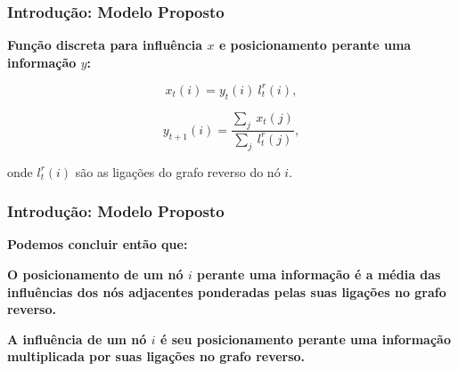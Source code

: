 \begin{frame}
  \frametitle{Introdução: Modelo Proposto}

  \textbf{Função discreta para influência $x$ e posicionamento perante
  uma informação $y$:}

  \begin{alertblock}{}

    \begin{equation}
      x_{t}(i) = y_{t}(i) \  l_{t}^{r}(i),
    \end{equation}

    \begin{equation}
      y_{t+1}(i) = \frac{\sum_{j} \  x_{t}(j)}{\sum_{j} \  l_{t}^{r}(j)},
    \end{equation}

  \end{alertblock}
  \vspace{5mm}

  onde $l_{t}^{r}(i)$ são as ligações do grafo reverso do nó $i$.
\end{frame}

\begin{frame}
  \frametitle{Introdução: Modelo Proposto}

  \textbf{Podemos concluir então que:}

  \begin{alertblock}{}
    \vspace{5mm}

    \textbf{\alert{O posicionamento de um nó $i$ perante uma informação} é a
      média das influências dos nós adjacentes ponderadas pelas suas ligações
      no grafo reverso.}
    \vspace{5mm}

    \textbf{\alert{A influência de um nó $i$} é seu posicionamento perante uma
      informação multiplicada por suas ligações no grafo reverso.}
    \vspace{5mm}
  \end{alertblock}

\end{frame}
